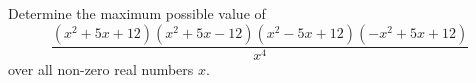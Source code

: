 Determine the maximum possible value of \[\frac{\left(x^2+5x+12\right)\left(x^2+5x-12\right)\left(x^2-5x+12\right)\left(-x^2+5x+12\right)}{x^4}\] over all non-zero real numbers $x$.